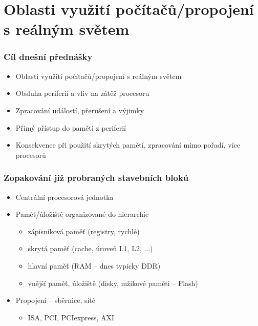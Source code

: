 \documentclass{beamer}
\subtitle{Lekce 09. Přerušení a události}
\author{Pavel Píša \phantom{xxxxxxxxx} Petr Štěpán \\ \small\texttt{pisa@fel.cvut.cz}\phantom{xxxx}\small\texttt{stepan@fel.cvut.cz}}
\begin{document}
\maketitle

\section{Oblasti využití počítačů/propojení s reálným světem}

\begin{frame}
\frametitle{Cíl dnešní přednášky}

\begin{itemize}
 \item Oblasti využití počítačů/propojení s reálným světem
 \item Obsluha periferií a vliv na zátěž procesoru
 \item Zpracování událostí, přerušení a výjimky
 \item Přímý přístup do paměti z periferií
 \item Konsekvence při použití skrytých pamětí, zpracování mimo pořadí, více procesorů
\end{itemize}
\end{frame}

\begin{frame}
\frametitle{Zopakování již probraných stavebních bloků}

\begin{itemize}
 \item Centrální procesorová jednotka
 \item Paměť/úložiště organizované do hierarchie
 \begin{itemize}
  \item zápisníková paměť (registry, rychlé)
  \item skrytá paměť (cache, úroveň L1, L2, ...)
  \item hlavní paměť (RAM -- dnes typicky DDR)
  \item vnější paměť, úložiště (disky, mžikové paměti -- Flash)
 \end{itemize}
 \item Propojení -- sběrnice, sítě
 \begin{itemize}
  \item ISA, PCI, PCIexpress, AXI
 \end{itemize}
\end{itemize}
\end{frame}
\end{document}
